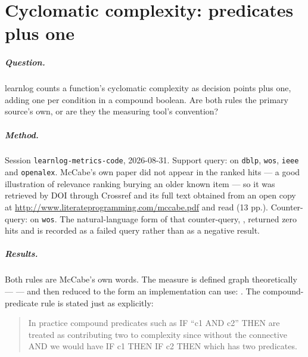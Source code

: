 \chapter{Cyclomatic complexity: predicates plus one}
\label{app:claim:cc-definition}

\paragraph{Question.}
learnlog counts a function's cyclomatic complexity as decision points plus
one, adding one per condition in a compound boolean.  Are both rules the
primary source's own, or are they the measuring tool's convention?

\paragraph{Method.}
Session \texttt{learnlog-metrics-code}, 2026-08-31.  Support query:
 on \texttt{dblp},
\texttt{wos}, \texttt{ieee} and \texttt{openalex}.  McCabe's own paper did
not appear in the ranked hits --- a good illustration of relevance ranking
burying an older known item --- so it was retrieved by DOI through Crossref
and its full text obtained from an open copy at
\url{http://www.literateprogramming.com/mccabe.pdf} and read (13 pp.).
Counter-query:  on \texttt{wos}.  The
natural-language form of that counter-query,
, returned zero hits and is
recorded as a failed query rather than as a negative result.

\paragraph{Results.}
Both rules are McCabe's own words.  The measure is defined graph
theoretically ---  --- and then reduced to the form an implementation can use:
.  The compound-predicate
rule is stated just as explicitly:
\blockcquote[p.~315]{McCabe1976}{In practice compound predicates such as IF
\enquote{c1 AND c2} THEN are treated as contributing two to complexity since
without the connective AND we would have IF c1 THEN IF c2 THEN which has two
predicates.}

